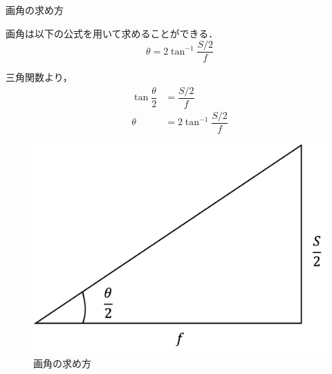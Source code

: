 \documentclass[8pt, jfont=ipaexm, t]{beamer} %
\begin{document}
\begin{frame}{画角の求め方}
  \begin{block}{}
    画角は以下の公式を用いて求めることができる．
    \begin{equation}
      \theta = 2 \tan^{-1}{\dfrac{S / 2}{f}}
    \end{equation}
  \end{block}

  \begin{block}{}
    三角関数より，
    \begin{align*}
      \tan{\dfrac{\theta}{2}} &= \dfrac{S / 2}{f} \\
      \theta &= 2 \tan^{-1}{\dfrac{S / 2}{f}}
    \end{align*}
  \end{block}

  \begin{figure}[H]
    \centering
    \includegraphics[scale=0.3]{figure/02.png}
    \caption{画角の求め方}
    \label{fig:02}
  \end{figure}
\end{frame}
\end{document}
